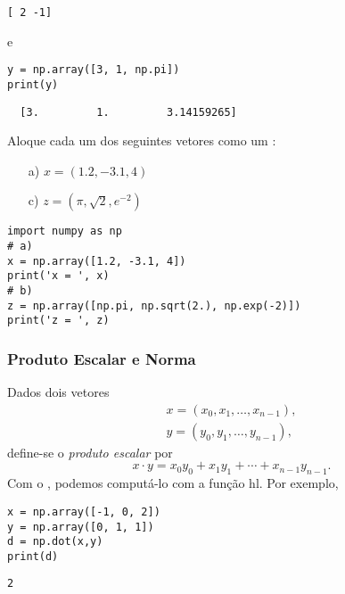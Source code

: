 \begin{verbatim}
[ 2 -1]
\end{verbatim}

e

\begin{lstlisting}
y = np.array([3, 1, np.pi])
print(y)
\end{lstlisting}

\begin{verbatim}
  [3.         1.         3.14159265]
\end{verbatim}

\begin{exer}
  Aloque cada um dos seguintes vetores como um {\PYTHONnumpyDOTarray}:
  \begin{enumerate}
  \item[a)] $x = (1.2, -3.1, 4)$
  \item[c)] $z = (\pi, \sqrt{2}, e^{-2})$
  \end{enumerate}
\end{exer}
\begin{resp}
  
\begin{lstlisting}
import numpy as np
# a)
x = np.array([1.2, -3.1, 4])
print('x = ', x)
# b)
z = np.array([np.pi, np.sqrt(2.), np.exp(-2)])
print('z = ', z)
\end{lstlisting}

\end{resp}

\subsubsection{Produto Escalar e Norma}

Dados dois vetores
\begin{gather}
  x = (x_0, x_1, \dotsc, x_{n-1}),\\
  y = (y_0, y_1, \dotsc, y_{n-1}),
\end{gather}
define-se o \emph{produto escalar} por
\begin{equation}
  x\cdot y = x_0y_0 + x_1y_1 + \cdots + x_{n-1}y_{n-1}.
\end{equation}
Com o {\numpy}, podemos computá-lo com a função hl{\PYTHONnumpyDOTdot}. Por exemplo,

\begin{lstlisting}
x = np.array([-1, 0, 2])
y = np.array([0, 1, 1])
d = np.dot(x,y)
print(d)
\end{lstlisting}

\begin{verbatim}
2
\end{verbatim}

